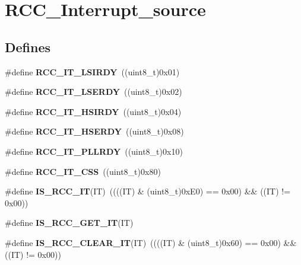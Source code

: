 \hypertarget{group__RCC__Interrupt__source}{
\section{RCC\_\-Interrupt\_\-source}
\label{group__RCC__Interrupt__source}
}
\subsection*{Defines}
\begin{DoxyCompactItemize}
\item 
\hypertarget{group__RCC__Interrupt__source_ga2b4ef277c1b71f96e0bef4b9a72fca94}{
\#define {\bfseries RCC\_\-IT\_\-LSIRDY}~((uint8\_\-t)0x01)}
\label{group__RCC__Interrupt__source_ga2b4ef277c1b71f96e0bef4b9a72fca94}

\item 
\hypertarget{group__RCC__Interrupt__source_gad6b6e78a426850f595ef180d292a673d}{
\#define {\bfseries RCC\_\-IT\_\-LSERDY}~((uint8\_\-t)0x02)}
\label{group__RCC__Interrupt__source_gad6b6e78a426850f595ef180d292a673d}

\item 
\hypertarget{group__RCC__Interrupt__source_ga69637e51b71f73f519c8c0a0613d042f}{
\#define {\bfseries RCC\_\-IT\_\-HSIRDY}~((uint8\_\-t)0x04)}
\label{group__RCC__Interrupt__source_ga69637e51b71f73f519c8c0a0613d042f}

\item 
\hypertarget{group__RCC__Interrupt__source_gad13eaede352bca59611e6cae68665866}{
\#define {\bfseries RCC\_\-IT\_\-HSERDY}~((uint8\_\-t)0x08)}
\label{group__RCC__Interrupt__source_gad13eaede352bca59611e6cae68665866}

\item 
\hypertarget{group__RCC__Interrupt__source_ga68d48e7811fb58f2649dce6cf0d823d9}{
\#define {\bfseries RCC\_\-IT\_\-PLLRDY}~((uint8\_\-t)0x10)}
\label{group__RCC__Interrupt__source_ga68d48e7811fb58f2649dce6cf0d823d9}

\item 
\hypertarget{group__RCC__Interrupt__source_ga9bb34a4912d2084dc1c0834eb53aa7a3}{
\#define {\bfseries RCC\_\-IT\_\-CSS}~((uint8\_\-t)0x80)}
\label{group__RCC__Interrupt__source_ga9bb34a4912d2084dc1c0834eb53aa7a3}

\item 
\hypertarget{group__RCC__Interrupt__source_ga710d72ccf88ddbec09b033c81a571a83}{
\#define {\bfseries IS\_\-RCC\_\-IT}(IT)~((((IT) \& (uint8\_\-t)0xE0) == 0x00) \&\& ((IT) != 0x00))}
\label{group__RCC__Interrupt__source_ga710d72ccf88ddbec09b033c81a571a83}

\item 
\#define {\bfseries IS\_\-RCC\_\-GET\_\-IT}(IT)
\item 
\hypertarget{group__RCC__Interrupt__source_ga8374741e47d696accd1a72647650ba63}{
\#define {\bfseries IS\_\-RCC\_\-CLEAR\_\-IT}(IT)~((((IT) \& (uint8\_\-t)0x60) == 0x00) \&\& ((IT) != 0x00))}
\label{group__RCC__Interrupt__source_ga8374741e47d696accd1a72647650ba63}

\end{DoxyCompactItemize}


